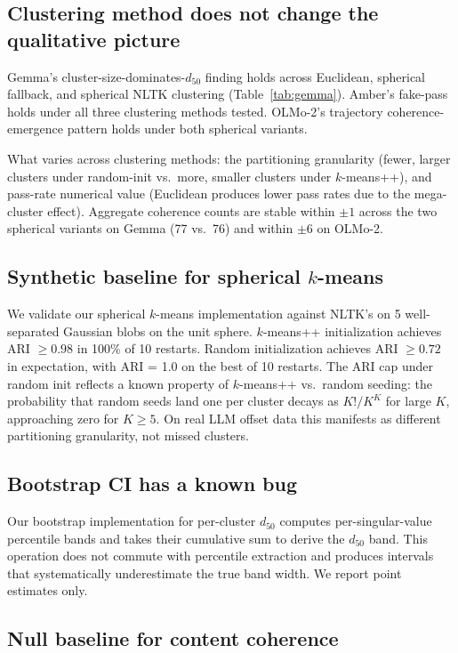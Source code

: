 \documentclass[11pt,letterpaper]{article}
\begin{document}
\subsection{Clustering method does not change the qualitative picture}

Gemma's cluster-size-dominates-$d_{50}$ finding holds across Euclidean, spherical fallback, and spherical NLTK clustering (Table~\ref{tab:gemma}). Amber's fake-pass holds under all three clustering methods tested. OLMo-2's trajectory coherence-emergence pattern holds under both spherical variants.

What varies across clustering methods: the partitioning granularity (fewer, larger clusters under random-init vs.\ more, smaller clusters under $k$-means++), and pass-rate numerical value (Euclidean produces lower pass rates due to the mega-cluster effect). Aggregate coherence counts are stable within $\pm 1$ across the two spherical variants on Gemma (77 vs.\ 76) and within $\pm 6$ on OLMo-2.

\subsection{Synthetic baseline for spherical $k$-means}

We validate our spherical $k$-means implementation against NLTK's on 5 well-separated Gaussian blobs on the unit sphere. $k$-means++ initialization achieves ARI $\geq 0.98$ in 100\% of 10 restarts. Random initialization achieves ARI $\geq 0.72$ in expectation, with ARI = 1.0 on the best of 10 restarts. The ARI cap under random init reflects a known property of $k$-means++ vs.\ random seeding: the probability that random seeds land one per cluster decays as $K! / K^K$ for large $K$, approaching zero for $K \geq 5$. On real LLM offset data this manifests as different partitioning granularity, not missed clusters.

\subsection{Bootstrap CI has a known bug}

Our bootstrap implementation for per-cluster $d_{50}$ computes per-singular-value percentile bands and takes their cumulative sum to derive the $d_{50}$ band. This operation does not commute with percentile extraction and produces intervals that systematically underestimate the true band width. We report point estimates only.

\subsection{Null baseline for content coherence}
\end{document}
